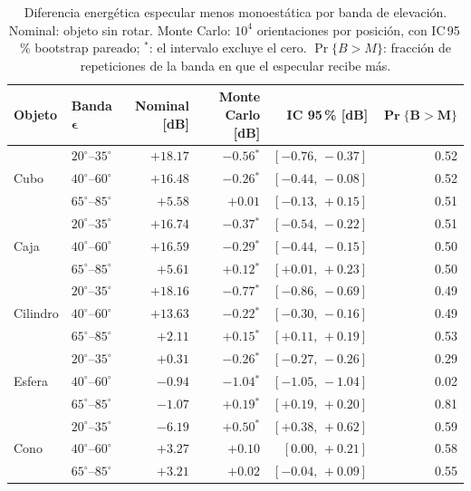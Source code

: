 \documentclass[11pt,a4paper]{report}
\newcommand{\sig}{$^{\ast}$}
\begin{document}
\begin{table}[H]
\centering
\caption{Diferencia energética especular menos monoestática por banda de
elevación. Nominal: objeto sin rotar. Monte Carlo: $10^4$ orientaciones por
posición, con IC\,95\,\% bootstrap pareado; $^{\ast}$: el intervalo excluye
el cero. $\Pr\{B>M\}$: fracción de repeticiones de la banda en que el
especular recibe más.}
\label{tab:mc_bandas}
\small
\begin{tabular}{@{}llrrrr@{}}
\toprule
\textbf{Objeto} & \textbf{Banda} $\bm{\epsilon}$ & \textbf{Nominal [dB]} & \textbf{Monte Carlo [dB]} & \textbf{IC 95\,\% [dB]} & $\bm{\Pr\{B>M\}}$ \\
\midrule
\multirow{3}{*}{Cubo}     & $20^\circ$--$35^\circ$ & $+18.17$ & $-0.56$\sig & $[-0.76,\,-0.37]$ & 0.52 \\
                          & $40^\circ$--$60^\circ$ & $+16.48$ & $-0.26$\sig & $[-0.44,\,-0.08]$ & 0.52 \\
                          & $65^\circ$--$85^\circ$ & $+5.58$  & $+0.01$     & $[-0.13,\,+0.15]$ & 0.51 \\
\midrule
\multirow{3}{*}{Caja}     & $20^\circ$--$35^\circ$ & $+16.74$ & $-0.37$\sig & $[-0.54,\,-0.22]$ & 0.51 \\
                          & $40^\circ$--$60^\circ$ & $+16.59$ & $-0.29$\sig & $[-0.44,\,-0.15]$ & 0.50 \\
                          & $65^\circ$--$85^\circ$ & $+5.61$  & $+0.12$\sig & $[+0.01,\,+0.23]$ & 0.50 \\
\midrule
\multirow{3}{*}{Cilindro} & $20^\circ$--$35^\circ$ & $+18.16$ & $-0.77$\sig & $[-0.86,\,-0.69]$ & 0.49 \\
                          & $40^\circ$--$60^\circ$ & $+13.63$ & $-0.22$\sig & $[-0.30,\,-0.16]$ & 0.49 \\
                          & $65^\circ$--$85^\circ$ & $+2.11$  & $+0.15$\sig & $[+0.11,\,+0.19]$ & 0.53 \\
\midrule
\multirow{3}{*}{Esfera}   & $20^\circ$--$35^\circ$ & $+0.31$  & $-0.26$\sig & $[-0.27,\,-0.26]$ & 0.29 \\
                          & $40^\circ$--$60^\circ$ & $-0.94$  & $-1.04$\sig & $[-1.05,\,-1.04]$ & 0.02 \\
                          & $65^\circ$--$85^\circ$ & $-1.07$  & $+0.19$\sig & $[+0.19,\,+0.20]$ & 0.81 \\
\midrule
\multirow{3}{*}{Cono}     & $20^\circ$--$35^\circ$ & $-6.19$  & $+0.50$\sig & $[+0.38,\,+0.62]$ & 0.59 \\
                          & $40^\circ$--$60^\circ$ & $+3.27$  & $+0.10$     & $[0.00,\,+0.21]$ & 0.58 \\
                          & $65^\circ$--$85^\circ$ & $+3.21$  & $+0.02$     & $[-0.04,\,+0.09]$ & 0.55 \\
\bottomrule
\end{tabular}
\end{table}
\end{document}
